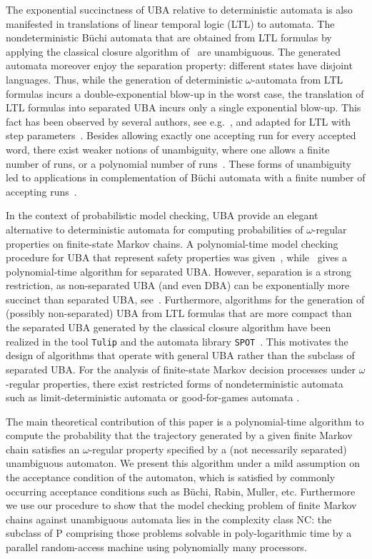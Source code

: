 \documentclass{elsarticle}
\newcommand{\spot}{\texttt{SPOT}}
\newcommand{\tulip}{\texttt{Tulip}}
\begin{document}
The exponential succinctness of UBA relative to deterministic automata
is also manifested in translations of linear temporal logic
(LTL) to automata.  The nondeterministic B\"{u}chi automata that are
obtained from LTL formulas by applying the classical closure algorithm
of~\cite{WVS83,VardiWolper86} are unambiguous. The generated automata
moreover enjoy the separation property: different states
have disjoint languages.  Thus, while the generation of deterministic
$\omega$-automata from LTL formulas incurs a double-exponential
blow-up in the worst case, the translation of LTL formulas into
separated UBA incurs only a single exponential blow-up. This fact has
been observed by several authors, see
e.g.~\cite{CouSahSut03,MorgensternThesis}, and adapted for LTL with
step parameters~\cite{Zimmermann13,ChaKat14}.
Besides allowing exactly one accepting run for every accepted word, there exist
weaker notions of unambiguity, where one allows a finite number of runs, or a
polynomial number of runs~\cite{RI89,HSS17}. These forms of unambiguity led to applications in
complementation of B\"uchi automata with a finite number of accepting runs~\cite{Rabinovich18}.



In the context of probabilistic model checking, UBA provide an elegant
alternative to deterministic automata for computing probabilities of
$\omega$-regular properties on finite-state Markov chains.  A
polynomial-time model checking procedure for UBA that represent safety
properties was given~\cite{BenLenWor14}, while~\cite{CouSahSut03}
gives a polynomial-time algorithm for separated UBA.  However,
separation is a strong restriction, as non-separated UBA (and even
DBA) can be exponentially more succinct than separated UBA,
see~\cite{BousLoed10}.  Furthermore, algorithms for the generation of
(possibly non-separated) UBA from LTL formulas that are more compact
than the separated UBA generated by the classical closure algorithm
have been realized in the tool \tulip{}
\cite{LenhardtThesis13,Len-Tulip13} and the automata library
\spot{}~\cite{Duret13}.  This motivates the design of algorithms that
operate with general UBA rather than the subclass of separated UBA.
For the analysis of finite-state Markov decision processes under
$\omega$-regular properties, there exist restricted forms of
nondeterministic automata such as limit-deterministic automata
\cite{Vardi85,CY95,SEJK16} or good-for-games automata
\cite{HP06,KMBK14}.

The main theoretical contribution of this paper is a polynomial-time
algorithm to compute the probability that the trajectory generated by
a given finite Markov chain satisfies an $\omega$-regular property
specified by a (not necessarily separated) unambiguous automaton.  We
present this algorithm under a mild assumption on the acceptance
condition of the automaton, which is satisfied by commonly occurring
acceptance conditions such as B\"{u}chi, Rabin, Muller, etc.
Furthermore we use our procedure to show that the model checking
problem of finite Markov chains against unambiguous automata lies in
the complexity class NC: the subclass of P comprising those problems
solvable in poly-logarithmic time by a parallel random-access machine
using polynomially many processors.
\end{document}
